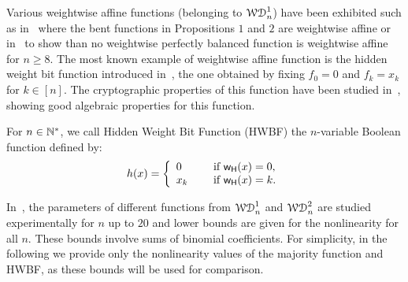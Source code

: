 \documentclass[11pt]{llncs}
\begin{document}
Various weightwise affine functions (\ie belonging to $\mathcal{WD}^{1}_{n}$) have been exhibited such as in~\cite{TOSC:CarMeaRot17} where the bent functions in Propositions $1$ and $2$ are weightwise affine or in~\cite{DAM:GinMea22} to show than no weightwise perfectly balanced function is weightwise affine for $n\ge 8$. 
The most known example of weightwise affine function is the hidden weight bit function introduced in~\cite{IEEE:Bryant91}, the one obtained by fixing $f_0=0$ and $f_k=x_k$ for $k \in [n]$. The cryptographic properties of this function have been studied in~\cite{DAM:WCST14}, showing good algebraic properties for this function.

\begin{definition}\label{def:hwbf}
	For $n\in \mathbb{N}^*$, we call Hidden Weight Bit Function (HWBF) the $n$-variable Boolean function defined by:
	\[h(x)= \left\{ 
	\begin{array}{l l}
	0 & \quad \text{ if } \mathsf{w_H}(x) =0, \\
	x_k & \quad \text{ if } \mathsf{w_H}(x)=k.
	\end{array} \right. \] 

\end{definition}

In~\cite{DAM:MeaOza24}, the parameters of different functions from $\mathcal{WD}^{1}_{n}$ and $\mathcal{WD}^{2}_{n}$ are studied experimentally for $n$ up to $20$ and lower bounds are given for the nonlinearity for all $n$. 
These bounds involve sums of binomial coefficients. For simplicity, in the following we provide only the nonlinearity values of the majority function and HWBF, as these bounds will be used for comparison.

\end{document}
